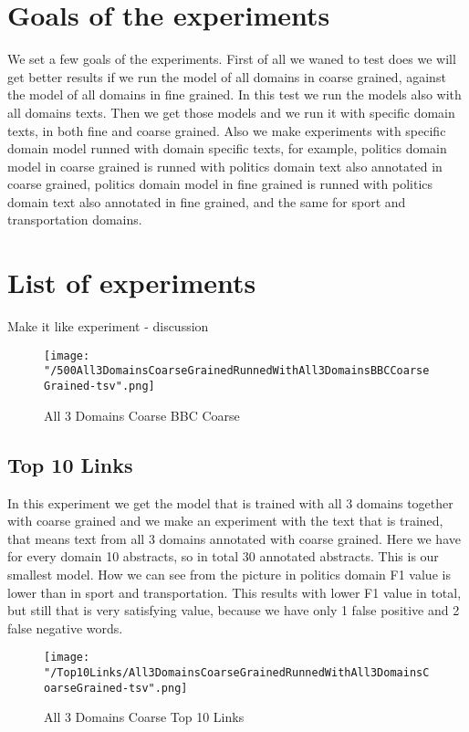 \documentclass[thesis=M,english]{FITthesis}[2018/05/30]
\begin{document}
\section{Goals of the experiments}
We set a few goals of the experiments. First of all we waned to test does we will get better results if we run the model of all domains in coarse grained, against the model of all domains in fine grained. In this test we run the models also with all domains texts. Then we get those models and we run it with specific domain texts, in both fine and coarse grained. Also we make experiments with specific domain model runned with domain specific texts, for example, politics domain model in coarse grained is runned with politics domain text also annotated in coarse grained, politics domain model in fine grained is runned with politics domain text also annotated in fine grained, and the same for sport and transportation domains.

\section{List of experiments}
Make it like experiment - discussion

	\begin{figure}[H]\centering
		\texttt{[image: "/500All3DomainsCoarseGrainedRunnedWithAll3DomainsBBCCoarseGrained-tsv".png]}
		\caption{All 3 Domains Coarse BBC Coarse}\label{}
	\end{figure}

\subsection{Top 10 Links}\label{subsec:Top10}
	In this experiment we get the model that is trained with all 3 domains together with coarse grained and we make an experiment with the text that is trained, that means text from all 3 domains annotated with coarse grained. 
	Here we have for every domain 10 abstracts, so in total 30 annotated abstracts. This is our smallest model.
	How we can see from the picture in politics domain F1 value is lower than in sport and transportation. This results with lower F1 value in total, but still that is very satisfying value, because we have only 1 false positive and 2 false negative words.  
	\begin{figure}[H]\centering
		\texttt{[image: "/Top10Links/All3DomainsCoarseGrainedRunnedWithAll3DomainsCoarseGrained-tsv".png]}
		\caption{All 3 Domains Coarse Top 10 Links}\label{img:All3DomainWithAll3DomainCoarseTop10}
	\end{figure}
	
\end{document}
